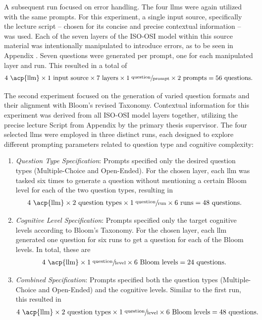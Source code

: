  A subsequent run focused on error handling. The four \acp{llm} were again utilized with the same prompts. For this experiment, a single input source, specifically the lecture script -- chosen for its concise and precise contextual information -- was used. Each of the seven layers of the ISO-OSI model within this source material was intentionally manipulated to introduce errors, as to be seen in Appendix . Seven questions were generated per prompt, one for each manipulated layer and run. This resulted in a total of \begin{align}4 \text{ \acp{llm}} \times 1 \text{ input source} \times 7 \text{ layers} \times 1 \sfrac{\text{ question}}{\text{prompt}} \times 2 \text{ prompts} = 56 \text{ questions.}\end{align}

\pagebreak

 The second experiment focused on the generation of varied question formats and their alignment with Bloom's revised Taxonomy. Contextual information for this experiment was derived from all ISO-OSI model layers together, utilizing the precise lecture Script from Appendix  by the primary thesis supervisor. The four selected \acp{llm} were employed in three distinct runs, each designed to explore different prompting parameters related to question type and cognitive complexity:

\begin{enumerate}
    \item \textit{Question Type Specification}: Prompts specified only the desired question types (Multiple-Choice and Open-Ended). For the chosen layer, each \ac{llm} was tasked six times to generate a question without mentioning a certain Bloom level for each of the two question types, resulting in \begin{align}4 \text{ \acp{llm}} \times 2 \text{ question types} \times 1 \sfrac{\text{ question}}{\text{run}}\times 6 \text{ runs} = 48 \text{ questions.}\end{align}
    \item \textit{Cognitive Level Specification}: Prompts specified only the target cognitive levels according to Bloom's Taxonomy. For the chosen layer, each \ac{llm} generated one question for six runs to get a question for each of the Bloom levels. In total, these are  \begin{align}4 \text{ \acp{llm}} \times 1 \sfrac{\text{ question}}{\text{level}} \times 6 \text{ Bloom levels} = 24 \text{ questions.}\end{align}
    \item \textit{Combined Specification}: Prompts specified both the question types (Multiple-Choice and Open-Ended) and the cognitive levels. Similar to the first run, this resulted in \begin{align}4 \text{ \acp{llm}} \times 2 \text{ question types} \times 1 \sfrac{\text{ question}}{\text{level}} \times 6 \text{ Bloom levels} = 48 \text{ questions.}\end{align}
\end{enumerate}

